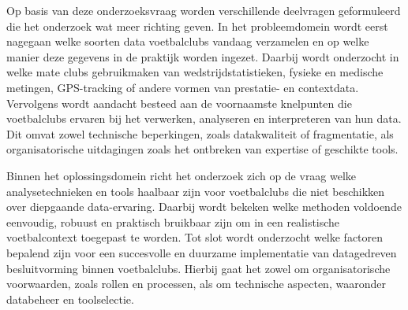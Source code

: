 

Op basis van deze onderzoeksvraag worden verschillende deelvragen geformuleerd die het onderzoek wat meer richting geven.
In het probleemdomein wordt eerst nagegaan welke soorten data voetbalclubs vandaag verzamelen en op welke manier deze gegevens in de praktijk worden ingezet.
Daarbij wordt onderzocht in welke mate clubs gebruikmaken van wedstrijdstatistieken, fysieke en medische metingen, GPS-tracking of andere vormen van prestatie- en contextdata.
Vervolgens wordt aandacht besteed aan de voornaamste knelpunten die voetbalclubs ervaren bij het verwerken, analyseren en interpreteren van hun data.
Dit omvat zowel technische beperkingen, zoals datakwaliteit of fragmentatie, als organisatorische uitdagingen zoals het ontbreken van expertise of geschikte tools.

Binnen het oplossingsdomein richt het onderzoek zich op de vraag welke analysetechnieken en tools haalbaar zijn voor voetbalclubs die niet beschikken over diepgaande data-ervaring.
Daarbij wordt bekeken welke methoden voldoende eenvoudig, robuust en praktisch bruikbaar zijn om in een realistische voetbalcontext toegepast te worden.
Tot slot wordt onderzocht welke factoren bepalend zijn voor een succesvolle en duurzame implementatie van datagedreven besluitvorming binnen voetbalclubs.
Hierbij gaat het zowel om organisatorische voorwaarden, zoals rollen en processen, als om technische aspecten, waaronder databeheer en toolselectie.

